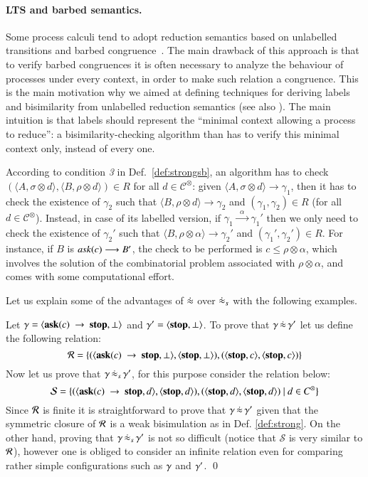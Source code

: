 \documentclass[main.tex]{subfiles}
\begin{document}
\paragraph{LTS and barbed semantics.} Some process calculi tend to adopt reduction semantics based on unlabelled transitions and barbed congruence~\cite{barbedMontanari}. The main drawback of this approach is that to verify barbed congruences it is often necessary to analyze the behaviour of processes under every context, in order to make such relation a congruence.
This is the main motivation why we aimed at defining techniques for deriving labels and bisimilarity from unlabelled reduction semantics (see also \cite{pippo}). The main intuition is that labels should represent the ``minimal context allowing a process to reduce'': a bisimilarity-checking algorithm than has to verify this minimal context only, instead of every one. 

According to condition \emph{3} in Def.~\ref{def:strongsb}, an algorithm has to check  $(\langle A,\sigma \otimes d\rangle, \langle B,\rho \otimes d \rangle) \in R$ for all $d \in \mathcal{C}^\otimes$: given $\langle A, \sigma \otimes d \rangle \longrightarrow \gamma_1$, then it has to check the existence of $\gamma_2$ such that $\langle B, \rho \otimes d \rangle \longrightarrow \gamma_2$ and $(\gamma_1, \gamma_2) \in R$ (for all $d \in \mathcal{C}^\otimes$). Instead, in case of its labelled version, if $\gamma_1 \xrightarrow{\; \; \alpha\;  \;} \gamma_1'$ then we only need to  check the existence of $\gamma_2'$ such that $\langle B, \rho \otimes \alpha \rangle \longrightarrow \gamma_2'$ and $(\gamma_1', \gamma_2') \in R$. For instance, if $B$ is $\mathit{ask}(c) \longrightarrow B'$, the check to be performed is $c \leq \rho \otimes \alpha$, which involves the solution of the combinatorial problem associated with $\rho \otimes \alpha$, and comes with some computational effort.

Let us explain some of the advantages of $\dot{\approx}$ over $\dot{\approx}_{s}$ with the following examples.

\begin{example}
\label{ex:barbvslabbis1}
Let $\gamma = \langle {\bf ask}(c) \ \rightarrow \ \mbox{{\bf stop}},\bot \rangle$ and $\gamma' = \langle \mbox{{\bf stop}},\bot \rangle$.
To prove that $\gamma\,\dot{\approx}\,\gamma'$ let us define the following relation:
\[ \mathcal{R} = \{ (\langle {\bf ask}(c) \ \rightarrow \ \mbox{{\bf stop}},\bot \rangle, \langle \mbox{{\bf stop}},\bot \rangle), (\langle \mbox{{\bf stop}},c \rangle, \langle \mbox{{\bf stop}},c \rangle)\} \]
Now let us prove that $\gamma\,\dot{\approx}_{s}\,\gamma'$, for this purpose consider the relation below:
\[
\mathcal{S} = \{ (\langle {\bf ask}(c) \ \rightarrow \ \mbox{{\bf stop}},d \rangle, \langle \mbox{{\bf stop}},d \rangle), (\langle \mbox{{\bf stop}},d \rangle, \langle \mbox{{\bf stop}},d \rangle) \ |\ d \in C^\otimes\} 
\]
Since $\mathcal{R}$ is finite it is straightforward to prove that $\gamma\,\dot{\approx}\,\gamma'$ given that 
the symmetric closure of $\mathcal{R}$ is a weak bisimulation as in Def. \ref{def:strong}.
On the other hand, proving that $\gamma\,\dot{\approx}_{s}\,\gamma'$ is not so difficult (notice that $\mathcal{S}$ is very similar to $\mathcal{R}$),
however one is obliged to consider an infinite relation even for comparing rather simple configurations such as $\gamma$ and $\gamma'$.
\qed
\end{example}
\end{document}
